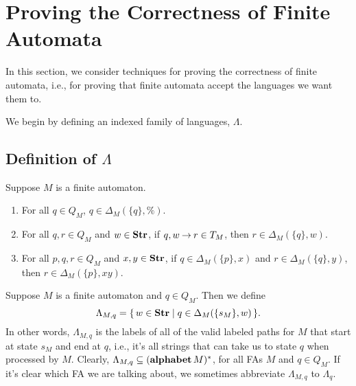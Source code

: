 \section{Proving the Correctness of Finite Automata}
\label{ProvingTheCorrectnessOfFiniteAutomata}

In this section, we consider techniques for proving the correctness
of finite automata, i.e., for proving that finite automata accept
the languages we want them to.

We begin by defining an indexed family of languages, $\Lambda$.

\subsection{Definition of $\Lambda$}

\begin{proposition}
\label{DeltaProp1}
Suppose $M$ is a finite automaton.
\begin{enumerate}[\quad(1)]
\item For all $q\in Q_M$, ${q}\in\Delta_M(\{q\},\%)$.

\item For all $q,r\in Q_M$ and $w\in\mathbf{Str}$, if $q,w\mathbin{\to} r\in T_M$,
then ${r}\in\Delta_M(\{q\},w)$.

\item For all $p,q,r\in Q_M$ and $x,y\in\mathbf{Str}$, if $q\in\Delta_M(\{p\},x)$
and $r\in\Delta_M(\{q\},y)$, then
${r}\in\Delta_M(\{p\},xy)$.
\end{enumerate}
\end{proposition}

Suppose $M$ is a finite automaton and $q\in Q_M$.
Then we define
%
%
\begin{displaymath}
\Lambda_{M,q} = \{ \, w\in\mathbf{Str} \mid q\in\Delta_M(\{s_M\},w) \, \}.
\end{displaymath}
In other words, $\Lambda_{M,q}$ is the labels of all of the valid
labeled paths for $M$ that start at state $s_M$ and end at $q$, i.e.,
it's all strings that can take us to state $q$ when processed by $M$.
Clearly, $\Lambda_{M,q}\subseteq(\mathbf{alphabet}\,M)^*$, for all FAs $M$ and
$q\in Q_M$.  If it's clear which FA we are talking about, we sometimes
abbreviate $\Lambda_{M,q}$ to $\Lambda_q$.

